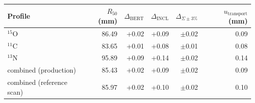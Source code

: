 \begin{tabular}{lrrrrr}
\toprule
Profile & $R_{50}$ (mm) & $\Delta_{\mathrm{BERT}}$ & $\Delta_{\mathrm{INCL}}$ & $\Delta_{\Sigma\pm3\%}$ & $u_{\mathrm{transport}}$ (mm) \\
\midrule
$^{15}$O & 86.49 & +0.02 & +0.09 & $\pm$0.02 & 0.09 \\
$^{11}$C & 83.65 & +0.01 & +0.08 & $\pm$0.01 & 0.08 \\
$^{13}$N & 95.89 & +0.09 & +0.14 & $\pm$0.02 & 0.14 \\
combined (production) & 85.43 & +0.02 & +0.09 & $\pm$0.02 & 0.09 \\
combined (reference scan) & 85.97 & +0.02 & +0.10 & $\pm$0.02 & 0.10 \\
\bottomrule
\end{tabular}
